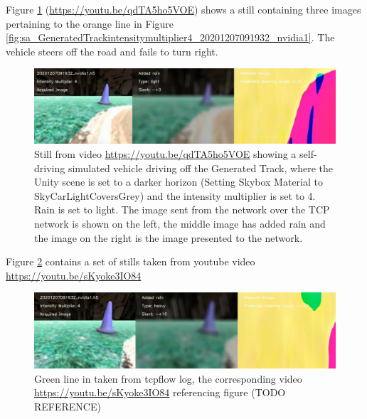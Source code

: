 Figure \ref{fig:youtube20201207091932nvidia1lightrainmult_4_h5} (\url{https://youtu.be/qdTA5ho5VOE}) shows a still containing three images pertaining to the orange line in Figure \ref{fig:sa_GeneratedTrackintensitymultiplier4_20201207091932_nvidia1}. The vehicle steers off the road and fails to turn right.

\begin{figure}[ht]
 \centering 
 \includegraphics[width=\textwidth]{Figures/youtube20201207091932nvidia1lightrainmult_4_h5.png}
 \caption{Still from video \url{https://youtu.be/qdTA5ho5VOE} showing a self-driving simulated vehicle driving off the Generated Track, where the Unity scene is set to a darker horizon (Setting Skybox Material to SkyCarLightCoversGrey) and the intensity multiplier is set to 4. Rain is set to light. The image sent from the network over the TCP network is shown on the left, the middle image has added rain and the image on the right is the image presented to the network.}
 \label{fig:youtube20201207091932nvidia1lightrainmult_4_h5} 
\end{figure}

Figure \ref{fig:youtube20201207091932nvidia1heavy10mult_4_h5} contains a set of stills taken from youtube video \url{https://youtu.be/sKyoke3IO84}
\begin{figure}[ht]
 \centering 
 \includegraphics[width=\textwidth]{Figures/youtube20201207091932nvidia1heavy10mult_4_h5.png}
 \caption{Green line in taken from tcpflow log, the corresponding video \url{https://youtu.be/sKyoke3IO84} referencing figure (TODO REFERENCE)}
 \label{fig:youtube20201207091932nvidia1heavy10mult_4_h5} 
\end{figure}


